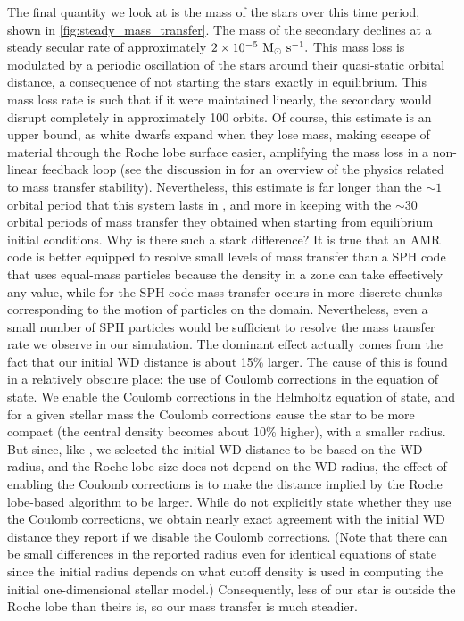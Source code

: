 \documentclass[12pt]{article}
\begin{document}
The final quantity we look at is the mass of the stars over this time period, shown in \autoref{fig:steady_mass_transfer}.
The mass of the secondary declines at a steady secular rate of approximately $2 \times 10^{-5}\ \msolar\ \text{s}^{-1}.$
This mass loss is modulated by a periodic oscillation of the stars around their quasi-static orbital distance,
a consequence of not starting the stars exactly in equilibrium.
This mass loss rate is such that if it were maintained linearly, the secondary would disrupt completely in
approximately 100 orbits. Of course, this estimate is an upper bound, as white dwarfs expand when
they lose mass, making escape of material through the Roche lobe surface easier, amplifying the mass loss
in a non-linear feedback loop (see the discussion in \citet[Section 2]{dan:2011} for an overview of the
physics related to mass transfer stability). Nevertheless, this estimate is far longer than the $\sim 1$
orbital period that this system lasts in \citet{dan:2011}, and more in keeping with the $\sim 30$ orbital
periods of mass transfer they obtained when starting from equilibrium initial conditions. Why is there
such a stark difference? It is true that an AMR code is better equipped to resolve small levels of mass transfer
than a SPH code that uses equal-mass particles because the density in a zone can take effectively
any value, while for the SPH code mass transfer occurs in more discrete chunks corresponding to the motion of
particles on the domain. Nevertheless, even a small number of SPH particles would be sufficient to
resolve the mass transfer rate we observe in our simulation. The dominant effect actually comes from
the fact that our initial WD distance is about 15\% larger. The cause of this is found in
a relatively obscure place: the use of Coulomb corrections in the equation of state. We enable the Coulomb
corrections in the Helmholtz equation of state, and for a given stellar mass the Coulomb corrections cause
the star to be more compact (the central density becomes about 10\% higher), with a smaller radius. But since,
like \citeauthor{dan:2011}, we selected the initial WD distance to be based on the WD radius, and the Roche lobe
size does not depend on the WD radius, the effect of enabling the Coulomb corrections is to make the distance
implied by the Roche lobe-based algorithm to be larger. While \citeauthor{dan:2011} do not explicitly state whether
they use the Coulomb corrections, we obtain nearly exact agreement with the initial WD distance they report
if we disable the Coulomb corrections. (Note that there can be small differences in the reported radius
even for identical equations of state since the initial radius depends on what cutoff density is used in
computing the initial one-dimensional stellar model.) Consequently, less of our star is outside the
Roche lobe than theirs is, so our mass transfer is much steadier.
\end{document}

